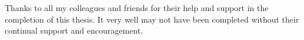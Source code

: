 \begin{acknowledgements}

Thanks to all my colleagues and friends for their help and support in the completion of this thesis.
It very well may not have been completed without their continual support and encouragement.

\end{acknowledgements}





